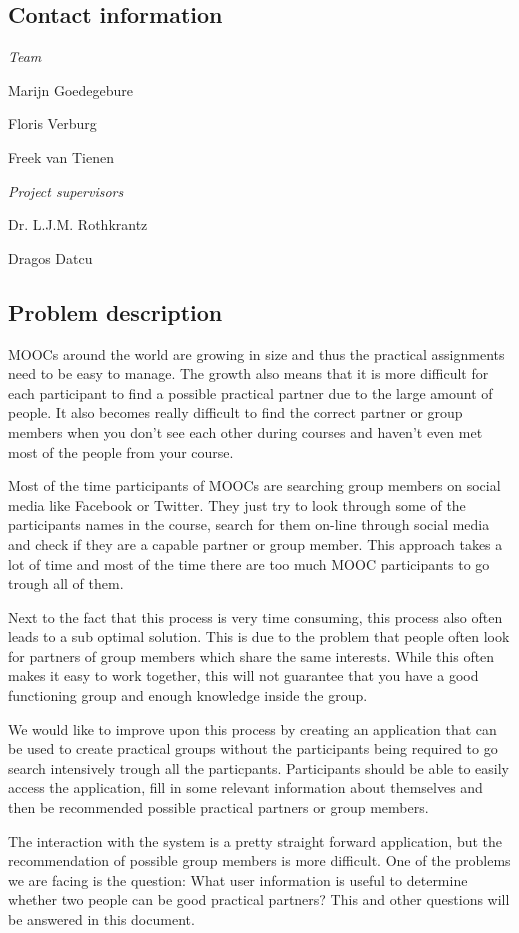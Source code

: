 \documentclass[]{article}
\begin{document}
\subsection{Contact information}
\emph{Team}

Marijn Goedegebure

Floris Verburg

Freek van Tienen

\noindent\emph{Project supervisors}

Dr. L.J.M. Rothkrantz

Dragos Datcu

\subsection{Problem description}
MOOCs around the world are growing in size and thus the practical assignments need to be easy to manage.
The growth also means that it is more difficult for each participant to find a possible practical partner due to the large amount of people.
It also becomes really difficult to find the correct partner or group members when you don't see each other during courses and haven't even met most of the people from your course.

Most of the time participants of MOOCs are searching group members on social media like Facebook or Twitter.
They just try to look through some of the participants names in the course, search for them on-line through social media and check if they are a capable partner or group member.
This approach takes a lot of time and most of the time there are too much MOOC participants to go trough all of them.

Next to the fact that this process is very time consuming, this process also often leads to a sub optimal solution.
This is due to the problem that people often look for partners of group members which share the same interests.
While this often makes it easy to work together, this will not guarantee that you have a good functioning group and enough knowledge inside the group.

We would like to improve upon this process by creating an application that can be used to create practical groups without the participants being required to go search intensively trough all the particpants.
Participants should be able to easily access the application, fill in some relevant information about themselves and then be recommended possible practical partners or group members.

The interaction with the system is a pretty straight forward application, but the recommendation of possible group members is more difficult.
One of the problems we are facing is the question: What user information is useful to determine whether two people can be good practical partners?
This and other questions will be answered in this document.
\end{document}
